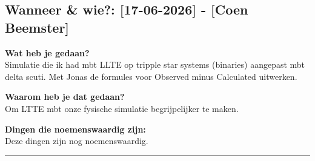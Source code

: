 
\subsection*{Wanneer \& wie?: [17-06-2026] - [Coen Beemster]}

\textbf{Wat heb je gedaan?}\\
Simulatie die ik had mbt LLTE op tripple star systems (binaries) aangepast mbt delta scuti. Met Jonas de formules voor Observed minus Calculated uitwerken.
\vspace{0.3cm} 

\noindent \textbf{Waarom heb je dat gedaan?}\\
Om LTTE mbt onze fysische simulatie begrijpelijker te maken.

\noindent \textbf{Dingen die noemenswaardig zijn:}\\
Deze dingen zijn nog noemenswaardig.


\vspace{0.5cm}
\hrule 
\vspace{0.5cm}
